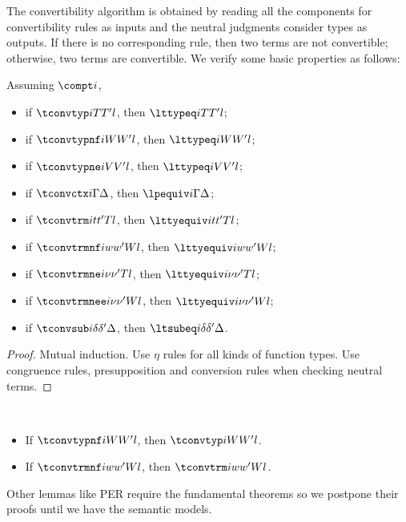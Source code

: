 The convertibility algorithm is obtained by reading all the components for
convertibility rules as inputs and the neutral judgments consider types as outputs. %
If there is no corresponding rule, then two terms are not convertible; otherwise, two
terms are convertible. %
We verify some basic properties as follows:
\begin{lemma}[Soundness] Assuming $\compt i$,
  \begin{itemize}
  \item if $\tconvtyp i T{T'} l$, then $\lttypeq i T{T'} l$;
  \item if $\tconvtypnf i W{W'} l$, then $\lttypeq i W{W'} l$;
  \item if $\tconvtypne i V{V'}l$, then $\lttypeq i{V}{V'}l$;
  \item if $\tconvctx i \Gamma \Delta$, then $\lpequiv i \Gamma \Delta$;
  \item if $\tconvtrm i t{t'}T l$, then $\lttyequiv i t{t'} T l$;
  \item if $\tconvtrmnf i w{w'}W l$, then $\lttyequiv i w{w'} W l$;
  \item if $\tconvtrmne i \nu{\nu'}T l$, then $\lttyequiv i\nu{\nu'} T l$;
  \item if $\tconvtrmnee i \nu{\nu'}W l$, then $\lttyequiv i \nu{\nu'} W l$;
  \item if $\tconvsub i{\delta}{\delta'}\Delta$, then $\ltsubeq i
    {\delta}{\delta'}{\Delta}$. 
  \end{itemize}
\end{lemma}
\begin{proof}
  Mutual induction.  %
  Use $\eta$ rules for all kinds of function types. %
  Use congruence rules, presupposition and conversion rules when checking neutral
  terms. %
\end{proof}

\begin{lemma} $ $
  \begin{itemize}
  \item If $\tconvtypnf i W{W'} l$, then $\tconvtyp i W{W'} l$. 
  \item If $\tconvtrmnf i w{w'}W l$, then $\tconvtrm i w{w'} W l$. 
  \end{itemize}
\end{lemma}

Other lemmas like PER require the fundamental theorems so we postpone their proofs
until we have the semantic models. 

